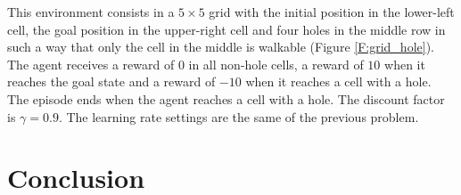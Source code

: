 \documentclass[conference]{IEEEtran}
\begin{document}
This environment consists in a $5 \times 5$ grid with the initial position in the lower-left cell, the goal position in the upper-right cell and four holes in the middle row in such a way that only the cell in the middle is walkable (Figure \ref{F:grid_hole}). The agent receives a reward of $0$ in all non-hole cells, a reward of $10$ when it reaches the goal state and a reward of $-10$ when it reaches a cell with a hole. The episode ends when the agent reaches a cell with a hole. The discount factor is $\gamma = 0.9$.
The learning rate settings are the same of the previous problem.

\section{Conclusion}






\end{document}
